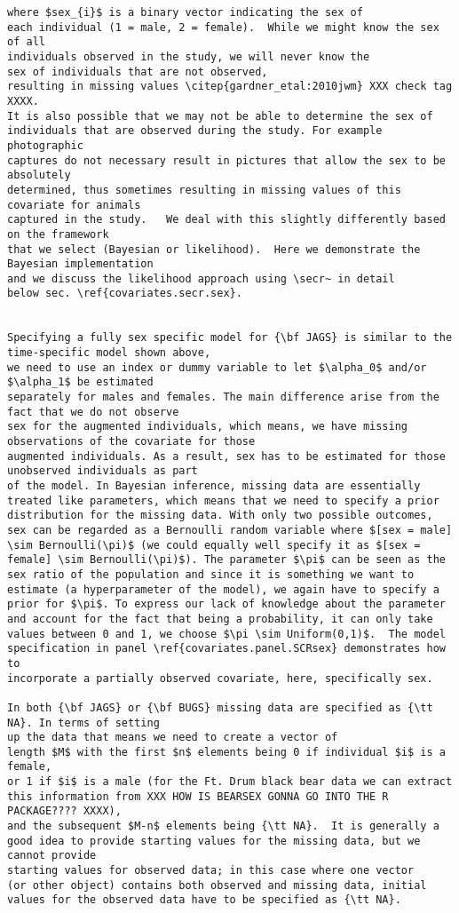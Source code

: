 {\begin{verbatim}
where $sex_{i}$ is a binary vector indicating the sex of
each individual (1 = male, 2 = female).  While we might know the sex of all
individuals observed in the study, we will never know the
sex of individuals that are not observed,
resulting in missing values \citep{gardner_etal:2010jwm} XXX check tag XXXX.
It is also possible that we may not be able to determine the sex of
individuals that are observed during the study. For example photographic
captures do not necessary result in pictures that allow the sex to be absolutely
determined, thus sometimes resulting in missing values of this covariate for animals
captured in the study.   We deal with this slightly differently based on the framework
that we select (Bayesian or likelihood).  Here we demonstrate the Bayesian implementation 
and we discuss the likelihood approach using \secr~ in detail
below sec. \ref{covariates.secr.sex}.


Specifying a fully sex specific model for {\bf JAGS} is similar to the time-specific model shown above, 
we need to use an index or dummy variable to let $\alpha_0$ and/or $\alpha_1$ be estimated 
separately for males and females. The main difference arise from the fact that we do not observe 
sex for the augmented individuals, which means, we have missing observations of the covariate for those 
augmented individuals. As a result, sex has to be estimated for those unobserved individuals as part 
of the model. In Bayesian inference, missing data are essentially treated like parameters, which means that we need to specify a prior distribution for the missing data. With only two possible outcomes, sex can be regarded as a Bernoulli random variable where $[sex = male] \sim Bernoulli(\pi)$ (we could equally well specify it as $[sex = female] \sim Bernoulli(\pi)$). The parameter $\pi$ can be seen as the sex ratio of the population and since it is something we want to estimate (a hyperparameter of the model), we again have to specify a prior for $\pi$. To express our lack of knowledge about the parameter and account for the fact that being a probability, it can only take values between 0 and 1, we choose $\pi \sim Uniform(0,1)$.  The model specification in panel \ref{covariates.panel.SCRsex} demonstrates how to 
incorporate a partially observed covariate, here, specifically sex.  

In both {\bf JAGS} or {\bf BUGS} missing data are specified as {\tt NA}. In terms of setting 
up the data that means we need to create a vector of  
length $M$ with the first $n$ elements being 0 if individual $i$ is a female, 
or 1 if $i$ is a male (for the Ft. Drum black bear data we can extract 
this information from XXX HOW IS BEARSEX GONNA GO INTO THE R PACKAGE???? XXXX), 
and the subsequent $M-n$ elements being {\tt NA}.  It is generally a 
good idea to provide starting values for the missing data, but we cannot provide 
starting values for observed data; in this case where one vector 
(or other object) contains both observed and missing data, initial 
values for the observed data have to be specified as {\tt NA}. 




\end{verbatim}}
